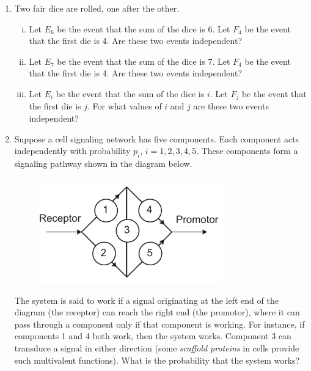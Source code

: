 \documentclass[12pt,letterpaper]{article}
\begin{document}
\begin{enumerate}

\item Two fair dice are rolled, one after the other. 
\begin{enumerate}[i.]
\item Let $E_{6}$ be the event that the sum of the dice is 6. Let $F_4$ be the event that the first die is 4. Are these two events independent?
\item Let $E_{7}$ be the event that the sum of the dice is 7. Let $F_4$ be the event that the first die is 4. Are these two events independent?
\item Let $E_i$ be the event that the sum of the dice is $i$. Let $F_j$ be the event that the first die is $j$. For what values of $i$ and $j$ are these two events independent?
\end{enumerate}

\item Suppose a cell signaling network has five components. Each component acts independently with probability $p_i$, $i=1,2,3,4,5$. These components form a signaling pathway shown in the diagram below. 
\begin{figure}[h!]
\centering\includegraphics[width=8cm]{figP12.pdf}
\end{figure}
The system is said to work if a signal originating at the left end of the diagram (the receptor) can reach the right end (the promotor), where it can pass through a component only if that component is working. For instance, if components 1 and 4 both work, then the system works. Component 3 can transduce a signal in either direction (some \emph{scaffold proteins} in cells provide such multivalent functions). What is the probability that the system works? 

\end{enumerate}
\end{document}
